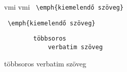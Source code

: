 \documentclass[a4paper,12pt]{article}
\begin{document}
	vmi vmi \verb| \emph{kiemelendő szöveg}|
	
	\verb*| \emph{kiemelendő szöveg}|
	
	\begin{verbatim}
		többsoros
		    verbatim szöveg
	\end{verbatim}
	\begin{verbatim*}
		többsoros
		    verbatim szöveg
	\end{verbatim*}
	
		
	
\end{document}
